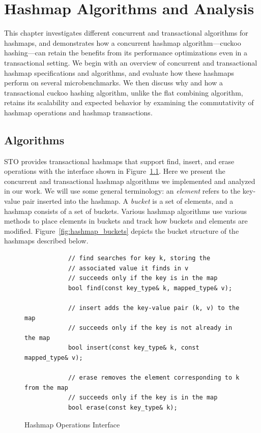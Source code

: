 \chapter{Hashmap Algorithms and Analysis}
\label{hashmap}

This chapter investigates different concurrent and transactional algorithms for hashmaps, and demonstrates how a concurrent hashmap algorithm---cuckoo hashing---can retain the benefits from its performance optimizations even in a transactional setting. We begin with an overview of concurrent and transactional hashmap specifications and algorithms, and evaluate how these hashmaps perform on several microbenchmarks. We then discuss why and how a transactional cuckoo hashing algorithm, unlike the flat combining algorithm, retains its scalability and expected behavior by examining the commutativity of hashmap operations and hashmap transactions.

\section{Algorithms}

STO provides transactional hashmaps that support find, insert, and erase operations with the interface shown in Figure~\ref{fig:hm_interface}. 
Here we present the concurrent and transactional hashmap algorithms we implemented and analyzed in our work. We will use some general terminology: an \emph{element} refers to the key-value pair inserted into the hashmap. A \emph{bucket} is a set of elements, and a hashmap consists of a set of buckets. Various hashmap algorithms use various methods to place elements in buckets and track how buckets and elements are modified. Figure~\ref{fig:hashmap_buckets} depicts the bucket structure of the hashmaps described below.

\begin{figure}[t]
    \centering
    \begin{lstlisting}
            // find searches for key k, storing the 
            // associated value it finds in v
            // succeeds only if the key is in the map
            bool find(const key_type& k, mapped_type& v); 
           
            // insert adds the key-value pair (k, v) to the map
            // succeeds only if the key is not already in the map
            bool insert(const key_type& k, const mapped_type& v); 

            // erase removes the element corresponding to k from the map
            // succeeds only if the key is in the map
            bool erase(const key_type& k); 
    \end{lstlisting}
    \caption{Hashmap Operations Interface}
    \label{fig:hm_interface}
\end{figure}

